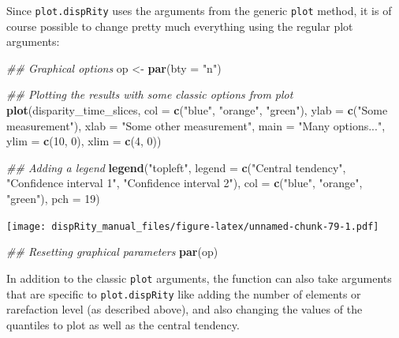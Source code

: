 \documentclass[
]{book}
\newenvironment{Shaded}{\begin{snugshade}}{\end{snugshade}}
\newcommand{\CommentTok}[1]{\textcolor[rgb]{0.56,0.35,0.01}{\textit{#1}}}
\newcommand{\DataTypeTok}[1]{\textcolor[rgb]{0.13,0.29,0.53}{#1}}
\newcommand{\DecValTok}[1]{\textcolor[rgb]{0.00,0.00,0.81}{#1}}
\newcommand{\KeywordTok}[1]{\textcolor[rgb]{0.13,0.29,0.53}{\textbf{#1}}}
\newcommand{\NormalTok}[1]{#1}
\newcommand{\StringTok}[1]{\textcolor[rgb]{0.31,0.60,0.02}{#1}}
\begin{document}
Since \texttt{plot.dispRity} uses the arguments from the generic \texttt{plot} method, it is of course possible to change pretty much everything using the regular plot arguments:

\begin{Shaded}
\begin{Highlighting}[]
\CommentTok{\#\# Graphical options}
\NormalTok{op \textless{}{-}}\StringTok{ }\KeywordTok{par}\NormalTok{(}\DataTypeTok{bty =} \StringTok{"n"}\NormalTok{)}

\CommentTok{\#\# Plotting the results with some classic options from plot}
\KeywordTok{plot}\NormalTok{(disparity\_time\_slices, }\DataTypeTok{col =} \KeywordTok{c}\NormalTok{(}\StringTok{"blue"}\NormalTok{, }\StringTok{"orange"}\NormalTok{, }\StringTok{"green"}\NormalTok{),}
    \DataTypeTok{ylab =} \KeywordTok{c}\NormalTok{(}\StringTok{"Some measurement"}\NormalTok{), }\DataTypeTok{xlab =} \StringTok{"Some other measurement"}\NormalTok{,}
    \DataTypeTok{main =} \StringTok{"Many options..."}\NormalTok{, }\DataTypeTok{ylim =} \KeywordTok{c}\NormalTok{(}\DecValTok{10}\NormalTok{, }\DecValTok{0}\NormalTok{), }\DataTypeTok{xlim =} \KeywordTok{c}\NormalTok{(}\DecValTok{4}\NormalTok{, }\DecValTok{0}\NormalTok{))}

\CommentTok{\#\# Adding a legend}
\KeywordTok{legend}\NormalTok{(}\StringTok{"topleft"}\NormalTok{, }\DataTypeTok{legend =} \KeywordTok{c}\NormalTok{(}\StringTok{"Central tendency"}\NormalTok{,}
                             \StringTok{"Confidence interval 1"}\NormalTok{,}
                             \StringTok{"Confidence interval 2"}\NormalTok{),}
      \DataTypeTok{col =} \KeywordTok{c}\NormalTok{(}\StringTok{"blue"}\NormalTok{, }\StringTok{"orange"}\NormalTok{, }\StringTok{"green"}\NormalTok{), }\DataTypeTok{pch =} \DecValTok{19}\NormalTok{)}
\end{Highlighting}
\end{Shaded}

\texttt{[image: dispRity\_manual\_files/figure-latex/unnamed-chunk-79-1.pdf]}

\begin{Shaded}
\begin{Highlighting}[]
\CommentTok{\#\# Resetting graphical parameters}
\KeywordTok{par}\NormalTok{(op)}
\end{Highlighting}
\end{Shaded}

In addition to the classic \texttt{plot} arguments, the function can also take arguments that are specific to \texttt{plot.dispRity} like adding the number of elements or rarefaction level (as described above), and also changing the values of the quantiles to plot as well as the central tendency.
\end{document}
